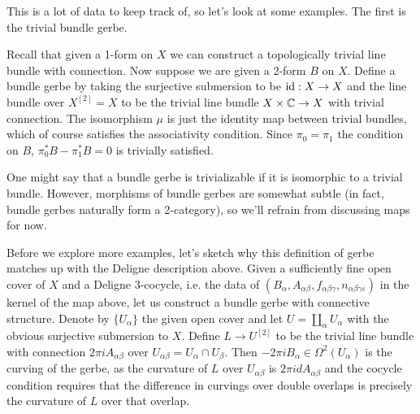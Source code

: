 \documentclass{amsart}
\begin{document}
This is a lot of data to keep track of, so let's look at some examples. The first is the trivial bundle gerbe.
\begin{example}
    Recall that given a 1-form on $X$ we can construct a topologically trivial line bundle
    with connection. Now suppose we are given a 2-form $B$ on $X$. Define a bundle gerbe by
    taking the surjective submersion to be $\operatorname{id}: X\to X$ and the line bundle over $X^{[2]}=X$
    to be the trivial line bundle $X\times\mathbb{C}\to X$ with trivial connection. The isomorphism
    $\mu$ is just the identity map between trivial bundles, which of course satisfies the
    associativity condition. Since $\pi_0=\pi_1$ the condition on $B$, $\pi_0^*B-\pi_1^*B=0$
    is trivially satisfied.
\end{example}
One might say that a bundle gerbe is trivializable if it is isomorphic to a trivial bundle.
However, morphisms of bundle gerbes are somewhat subtle (in fact, bundle gerbes naturally
form a 2-category), so we'll refrain from discussing maps for now.

Before we explore more examples, let's sketch why this definition of gerbe matches
up with the Deligne description above. Given a sufficiently fine open cover of $X$ and a
Deligne 3-cocycle, i.e. the data of
$(B_\alpha,A_{\alpha\beta},f_{\alpha\beta\gamma},n_{\alpha\beta\gamma\varepsilon})$
in the kernel of the map above, let us construct a bundle gerbe with connective
structure. Denote by $\{U_\alpha\}$ the given open cover and let
$U=\coprod_\alpha U_\alpha$ with the obvious surjective submersion to $X$.
Define $L\to U^{[2]}$ to be the trivial line bundle with connection $2\pi i A_{\alpha\beta}$
over $U_{\alpha\beta}=U_\alpha\cap U_\beta$. Then $-2\pi iB_\alpha\in\Omega^2(U_\alpha)$
is the curving of the gerbe, as the curvature of $L$ over $U_{\alpha\beta}$ is
$2\pi idA_{\alpha\beta}$ and the cocycle condition requires that the difference
in curvings over double overlaps is precisely the curvature of $L$ over that overlap.
\end{document}
